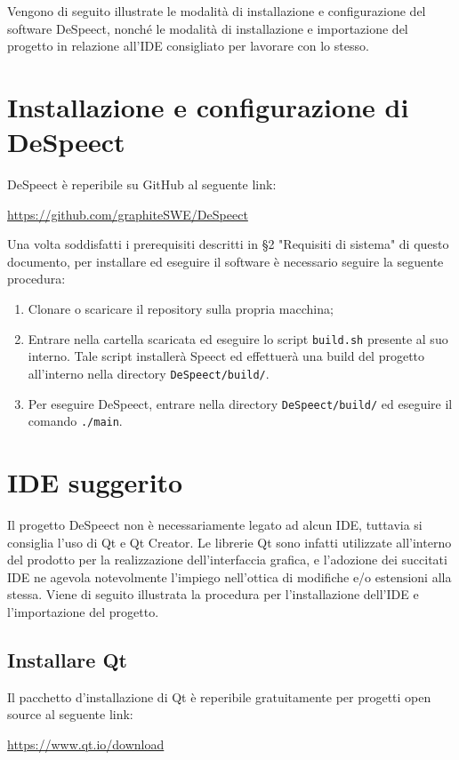 \documentclass[openany,12pt,a4paper]{report}
\begin{document}
	Vengono di seguito illustrate le modalità di installazione e configurazione del software DeSpeect, nonché le modalità di installazione e importazione del progetto in relazione all'IDE consigliato per lavorare con lo stesso.
	
	\section{Installazione e configurazione di DeSpeect}
	
	DeSpeect è reperibile su GitHub al seguente link:
	\begin{center}
		\url{https://github.com/graphiteSWE/DeSpeect}
	\end{center}
	
	\noindent Una volta soddisfatti i prerequisiti descritti in §2 "Requisiti di sistema" di questo documento, per installare ed eseguire il software è necessario seguire la seguente procedura:
	\begin{enumerate}
		\item Clonare o scaricare il repository sulla propria macchina;
		\item Entrare nella cartella scaricata ed eseguire lo script \verb|build.sh| presente al suo interno. Tale script installerà Speect ed effettuerà una build del progetto all'interno nella directory \verb|DeSpeect/build/|.
		\item Per eseguire DeSpeect, entrare nella directory \verb|DeSpeect/build/| ed eseguire il comando \verb|./main|.
	\end{enumerate}
	
	\section{IDE suggerito}
	Il progetto DeSpeect non è necessariamente legato ad alcun IDE, tuttavia si consiglia l'uso di Qt e Qt Creator. Le librerie Qt sono infatti utilizzate all'interno del prodotto per la realizzazione dell'interfaccia grafica, e l'adozione dei succitati IDE ne agevola notevolmente l'impiego nell'ottica di modifiche e/o estensioni alla stessa. Viene di seguito illustrata la procedura per l'installazione dell'IDE e l'importazione del progetto.
	
	\subsection{Installare Qt}
	
	Il pacchetto d'installazione di Qt è reperibile gratuitamente per progetti open source al seguente link:
	\begin{center}
		\url{https://www.qt.io/download}
	\end{center}
	
\end{document}
